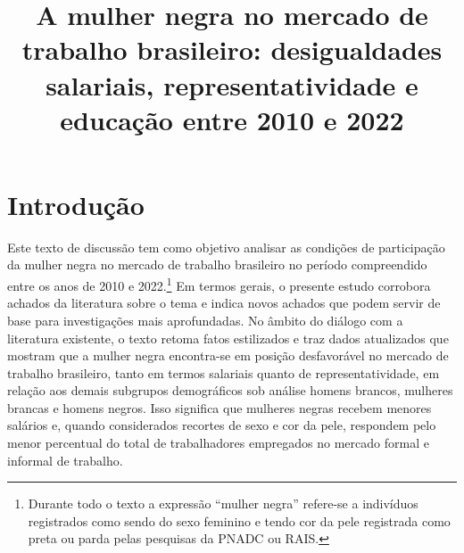 \documentclass[12pt]{article}
\begin{document}
 

\linespread{1.1}

\title{%
  A mulher negra no mercado de trabalho brasileiro: desigualdades salariais, representatividade e educação entre 2010 e 2022\\
  \vspace{1cm}
}


\maketitle

\clearpage

\thispagestyle{empty}

\thispagestyle{empty}

\section{Introdução}

\par Este texto de discussão tem como objetivo analisar as condições de participação da mulher negra no mercado de trabalho brasileiro no período compreendido entre os anos de 2010 e 2022.\footnote{Durante todo o texto a expressão \enquote{mulher negra} refere-se a indivíduos registrados como sendo do sexo feminino e tendo cor da pele registrada como preta ou parda pelas pesquisas da PNADC ou RAIS.} Em termos gerais, o presente estudo corrobora achados da literatura sobre o tema e indica novos achados que podem servir de base para investigações mais aprofundadas. No âmbito do diálogo com a literatura existente, o texto retoma fatos estilizados e traz dados atualizados que mostram que a mulher negra encontra-se em posição desfavorável no mercado de trabalho brasileiro, tanto em termos salariais quanto de representatividade, em relação aos demais subgrupos de\-mo\-grá\-fi\-cos sob análise \textemdash homens brancos, mulheres brancas e homens negros. Isso significa que mulheres negras recebem menores salários e, quando considerados recortes de sexo e cor da pele, respondem pelo menor percentual do total de trabalhadores empregados no mercado formal e informal de trabalho. 
\end{document}
